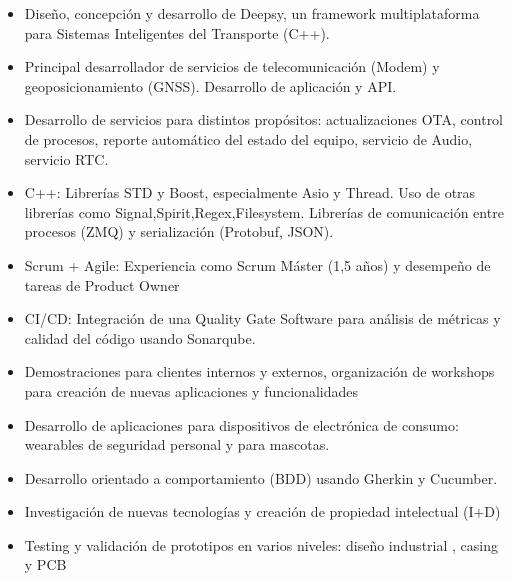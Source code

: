\documentclass[10pt,a4paper,normalphoto]{altacv}
\begin{document}
\begin{paracol}{2}


\begin{itemize}
\item Diseño, concepción y desarrollo de Deepsy, un framework multiplataforma  para Sistemas Inteligentes del Transporte (C++).
\item Principal desarrollador de servicios de telecomunicación (Modem) y geoposicionamiento (GNSS). Desarrollo de aplicación y API.
\item Desarrollo de servicios para distintos propósitos: actualizaciones OTA, control de procesos, reporte automático del estado del equipo, servicio de Audio, servicio RTC. 
\item C++: Librerías STD y Boost, especialmente Asio y Thread. Uso de otras librerías como Signal,Spirit,Regex,Filesystem. Librerías de comunicación entre procesos (ZMQ) y  serialización (Protobuf, JSON).
\item Scrum + Agile: Experiencia como Scrum Máster (1,5 años) y desempeño de tareas de Product Owner
\item CI/CD: Integración de una Quality Gate Software para análisis de métricas y calidad del código usando Sonarqube.
\item Demostraciones para clientes internos y externos, organización de workshops para creación de nuevas aplicaciones y funcionalidades

\end{itemize}

\divider

\begin{itemize}
\item Desarrollo de aplicaciones para dispositivos de electrónica de consumo: wearables de seguridad personal y para mascotas. 
\item Desarrollo orientado a comportamiento (BDD) usando Gherkin y Cucumber.
\item Investigación de nuevas tecnologías y creación de propiedad intelectual (I+D)
\item Testing y validación de prototipos en varios niveles: diseño industrial , casing y PCB 
\end{itemize}



\end{paracol}
\end{document}
